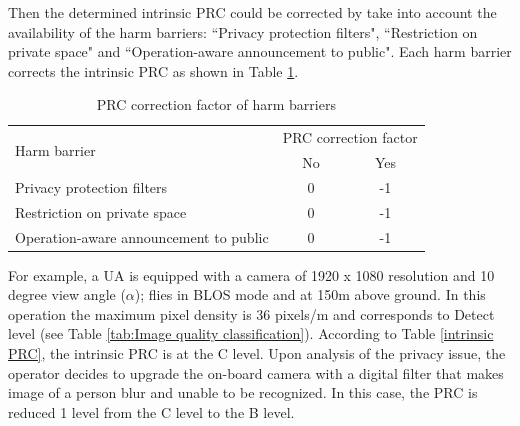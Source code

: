 \documentclass[a4paper, 10, conference]{ieeeconf}  %
\begin{document}
Then the determined intrinsic PRC could be corrected by take into account the availability of the harm barriers: ``Privacy protection filters", ``Restriction on private space" and ``Operation-aware announcement to public". Each harm barrier corrects the intrinsic PRC as shown in Table \ref{PRC reduction}. 
\begin{table}[]
	\centering
		\begin{tabular}{|l|c|c|}
			\hline
			\multirow{2}{*}{Harm barrier} & \multicolumn{2}{c|}{PRC correction factor} \\ \cline{2-3} 
			& No & Yes \\ \hline
			Privacy protection filters & 0 & -1 \\ \hline
			Restriction on private space & 0 & -1 \\ \hline
			Operation-aware announcement to public & 0 & -1 \\ \hline
		\end{tabular}%
	\caption{PRC correction factor of harm barriers}
	\label{PRC reduction}
\end{table}
 

For example, a UA is equipped with a camera of 1920 x 1080 resolution and 10 degree view angle ($\alpha$); flies in BLOS mode and at 150m above ground. In this operation the maximum pixel density is 36 pixels/m and corresponds to Detect level (see Table \ref{tab:Image quality classification}). According to Table \ref{intrinsic PRC}, the intrinsic PRC is at the C level. Upon analysis of the privacy issue, the operator decides to upgrade the on-board camera with a digital filter that makes image of a person blur and unable to be recognized. In this case, the PRC is reduced 1 level from the C level to the B level. 
\end{document}
